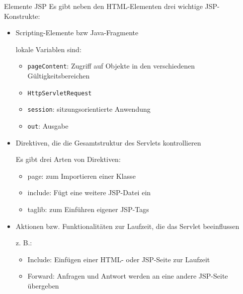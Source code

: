 \begin{bonus}{Elemente JSP}
    Es gibt neben den HTML-Elementen drei wichtige JSP-Konstrukte:
    \begin{itemize}
        \item Scripting-Elemente bzw Java-Fragmente

              lokale Variablen sind:
              \begin{itemize}
                  \item \texttt{pageContent}: Zugriff auf Objekte in den verschiedenen Gültigkeitsbereichen
                  \item \texttt{HttpServletRequest}
                  \item \texttt{session}: sitzungsorientierte Anwendung
                  \item \texttt{out}: Ausgabe
              \end{itemize}
        \item Direktiven, die die Gesamtstruktur des Servlets kontrollieren

              Es gibt drei Arten von Direktiven:
              \begin{itemize}
                  \item page: zum Importieren einer Klasse
                  \item include: Fügt eine weitere JSP-Datei ein
                  \item taglib: zum Einführen eigener JSP-Tags
              \end{itemize}
        \item Aktionen bzw. Funktionalitäten zur Laufzeit, die das Servlet beeinflussen

              z. B.:
              \begin{itemize}
                  \item Include: Einfügen einer HTML- oder JSP-Seite zur Laufzeit
                  \item Forward: Anfragen und Antwort werden an eine andere JSP-Seite übergeben
              \end{itemize}
    \end{itemize}
\end{bonus}

